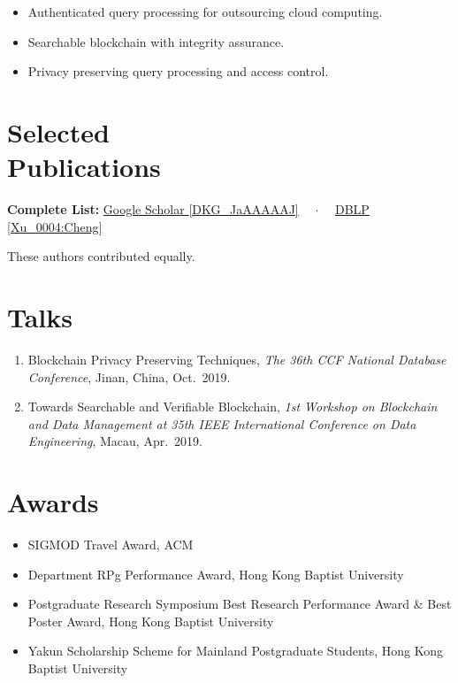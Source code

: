 \documentclass{mycv}
\begin{document}
\begin{itemize}
  \item Authenticated query processing for outsourcing cloud computing.
  \item Searchable blockchain with integrity assurance.
  \item Privacy preserving query processing and access control.
\end{itemize}

\section{Selected \\ Publications}%

\textbf{Complete List:}
\href{https://scholar.google.com/citations?user=DKG_JaAAAAAJ}{Google Scholar \textsf{\footnotesize [DKG\_JaAAAAAJ]}}%
{~~$\cdot$~~}%
\href{https://dblp.org/pers/hd/x/Xu_0004:Cheng}{DBLP \textsf{\footnotesize [Xu\_0004:Cheng]}}%


{
\footnotesize%
\textsuperscript{\textdagger}These authors contributed equally.
}

\section{Talks}

\begin{enumerate}
  \item Blockchain Privacy Preserving Techniques, \emph{The 36th CCF National Database Conference}, Jinan, China, Oct.~2019.
  \item Towards Searchable and Verifiable Blockchain, \emph{1st Workshop on Blockchain and Data Management at 35th IEEE International Conference on Data Engineering}, Macau, Apr.~2019.
\end{enumerate}

\section{Awards}

\begin{itemize}
  \item SIGMOD Travel Award, ACM 
  \item Department RPg Performance Award, Hong Kong Baptist University 
  \item Postgraduate Research Symposium Best Research Performance Award \& Best Poster Award, Hong Kong Baptist University 
  \item Yakun Scholarship Scheme for Mainland Postgraduate Students, Hong Kong Baptist University 
\end{itemize}
\end{document}

